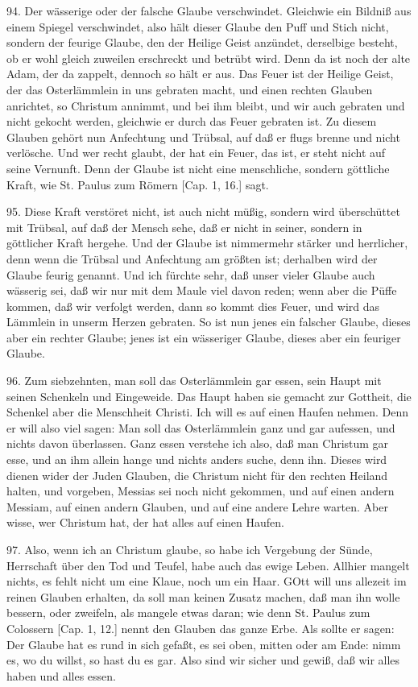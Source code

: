94. Der wässerige oder der falsche Glaube verschwindet. Gleichwie ein Bildniß aus einem Spiegel verschwindet, also hält dieser Glaube den Puff und Stich nicht, sondern der feurige Glaube, den der Heilige Geist anzündet, derselbige besteht, ob er wohl gleich zuweilen erschreckt und betrübt wird. Denn da ist noch der alte Adam, der da zappelt, dennoch so hält er aus. Das Feuer ist der Heilige Geist, der das Osterlämmlein in uns gebraten macht, und einen rechten Glauben anrichtet, so Christum annimmt, und bei ihm bleibt, und wir auch gebraten und nicht gekocht werden, gleichwie er durch das Feuer gebraten ist. Zu diesem Glauben gehört nun Anfechtung und Trübsal, auf daß er flugs brenne und nicht verlösche. Und wer recht glaubt, der hat ein Feuer, das ist, er steht nicht auf seine Vernunft. Denn der Glaube ist nicht eine menschliche, sondern göttliche Kraft, wie St. Paulus zum Römern [Cap. 1, 16.] sagt.

95. Diese Kraft verstöret nicht, ist auch nicht müßig, sondern wird überschüttet mit Trübsal, auf daß der Mensch sehe, daß er nicht in seiner, sondern in göttlicher Kraft hergehe. Und der Glaube ist nimmermehr stärker und herrlicher, denn wenn die Trübsal und Anfechtung am größten ist; derhalben wird der Glaube feurig genannt. Und ich fürchte sehr, daß unser vieler Glaube auch wässerig sei, daß wir nur mit dem Maule viel davon reden; wenn aber die Püffe kommen, daß wir verfolgt werden, dann so kommt dies Feuer, und wird das Lämmlein in unserm Herzen gebraten. So ist nun jenes ein falscher Glaube, dieses aber ein rechter Glaube; jenes ist ein wässeriger Glaube, dieses aber ein feuriger Glaube.

96. Zum siebzehnten, man soll das Osterlämmlein gar essen, sein Haupt mit seinen Schenkeln und Eingeweide. Das Haupt haben sie gemacht zur Gottheit, die Schenkel aber die Menschheit Christi. Ich will es auf einen Haufen nehmen. Denn er will also viel sagen: Man soll das Osterlämmlein ganz und gar aufessen, und nichts davon überlassen. Ganz essen verstehe ich also, daß man Christum gar esse, und an ihm allein hange und nichts anders suche, denn ihn. Dieses wird dienen wider der Juden Glauben, die Christum nicht für den rechten Heiland halten, und vorgeben, Messias sei noch nicht gekommen, und auf einen andern Messiam, auf einen andern Glauben, und auf eine andere Lehre warten. Aber wisse, wer Christum hat, der hat alles auf einen Haufen.

97. Also, wenn ich an Christum glaube, so habe ich Vergebung der Sünde, Herrschaft über den Tod und Teufel, habe auch das ewige Leben. Allhier mangelt nichts, es fehlt nicht um eine Klaue, noch um ein Haar. GOtt will uns allezeit im reinen Glauben erhalten, da soll man keinen Zusatz machen, daß man ihn wolle bessern, oder zweifeln, als mangele etwas daran; wie denn St. Paulus zum Colossern [Cap. 1, 12.] nennt den Glauben das ganze Erbe. Als sollte er sagen: Der Glaube hat es rund in sich gefaßt, es sei oben, mitten oder am Ende: nimm es, wo du willst, so hast du es gar. Also sind wir sicher und gewiß, daß wir alles haben und alles essen.


